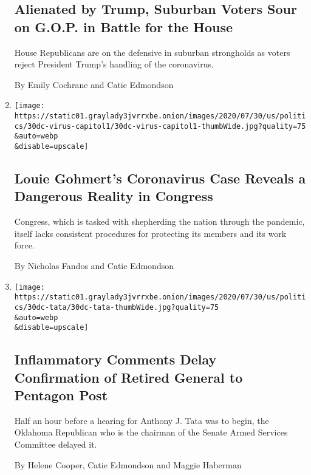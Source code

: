 \begin{enumerate}
  \hypertarget{alienated-by-trump-suburban-voters-sour-on-gop-in-battle-for-the-house}{%
  \subsection{Alienated by Trump, Suburban Voters Sour on G.O.P. in
  Battle for the
  House}\label{alienated-by-trump-suburban-voters-sour-on-gop-in-battle-for-the-house}}

  House Republicans are on the defensive in suburban strongholds as
  voters reject President Trump's handling of the coronavirus.

  By Emily Cochrane and Catie Edmondson
\item
  \href{/2020/07/30/us/politics/gohmert-coronavirus-congress.html}{}

  \texttt{[image: https://static01.graylady3jvrrxbe.onion/images/2020/07/30/us/politics/30dc-virus-capitol1/30dc-virus-capitol1-thumbWide.jpg?quality=75\\\&auto=webp\\\&disable=upscale]}

  \hypertarget{louie-gohmerts-coronavirus-case-reveals-a-dangerous-reality-in-congress}{%
  \subsection{Louie Gohmert's Coronavirus Case Reveals a Dangerous
  Reality in
  Congress}\label{louie-gohmerts-coronavirus-case-reveals-a-dangerous-reality-in-congress}}

  Congress, which is tasked with shepherding the nation through the
  pandemic, itself lacks consistent procedures for protecting its
  members and its work force.

  By Nicholas Fandos and Catie Edmondson
\item
  \href{/2020/07/30/us/politics/trump-inhofe-tata-pentagon.html}{}

  \texttt{[image: https://static01.graylady3jvrrxbe.onion/images/2020/07/30/us/politics/30dc-tata/30dc-tata-thumbWide.jpg?quality=75\\\&auto=webp\\\&disable=upscale]}

  \hypertarget{inflammatory-comments-delay-confirmation-of-retired-general-to-pentagon-post}{%
  \subsection{Inflammatory Comments Delay Confirmation of Retired
  General to Pentagon
  Post}\label{inflammatory-comments-delay-confirmation-of-retired-general-to-pentagon-post}}

  Half an hour before a hearing for Anthony J. Tata was to begin, the
  Oklahoma Republican who is the chairman of the Senate Armed Services
  Committee delayed it.

  By Helene Cooper, Catie Edmondson and Maggie Haberman
\end{enumerate}

